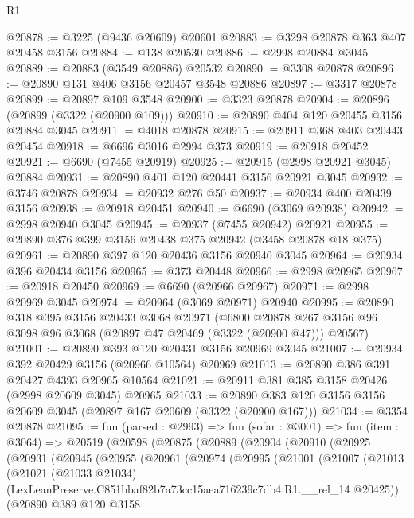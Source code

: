 \begin{lexlean}{R1}
\begin{coremodule}
@20878 := @3225 (@9436 @20609) @20601
@20883 := @3298 @20878 @363 @407 @20458 @3156
@20884 := @138 @20530
@20886 := @2998 @20884 @3045
@20889 := @20883 (@3549 @20886) @20532
@20890 := @3308 @20878
@20896 := @20890 @131 @406 @3156 @20457 @3548 @20886
@20897 := @3317 @20878
@20899 := @20897 @109 @3548
@20900 := @3323 @20878
@20904 := @20896 (@20899 (@3322 (@20900 @109)))
@20910 := @20890 @404 @120 @20455 @3156 @20884 @3045
@20911 := @4018 @20878
@20915 := @20911 @368 @403 @20443 @20454
@20918 := @6696 @3016 @2994 @373
@20919 := @20918 @20452
@20921 := @6690 (@7455 @20919)
@20925 := @20915 (@2998 @20921 @3045) @20884
@20931 := @20890 @401 @120 @20441 @3156 @20921 @3045
@20932 := @3746 @20878
@20934 := @20932 @276 @50
@20937 := @20934 @400 @20439 @3156
@20938 := @20918 @20451
@20940 := @6690 (@3069 @20938)
@20942 := @2998 @20940 @3045
@20945 := @20937 (@7455 @20942) @20921
@20955 := @20890 @376 @399 @3156 @20438 @375 @20942 (@3458 @20878 @18 @375)
@20961 := @20890 @397 @120 @20436 @3156 @20940 @3045
@20964 := @20934 @396 @20434 @3156
@20965 := @373 @20448
@20966 := @2998 @20965
@20967 := @20918 @20450
@20969 := @6690 (@20966 @20967)
@20971 := @2998 @20969 @3045
@20974 := @20964 (@3069 @20971) @20940
@20995 := @20890
    @318
    @395
    @3156
    @20433
    @3068
    @20971
    (@6800 @20878 @267 @3156 @96 @3098 @96 @3068 (@20897 @47 @20469 (@3322 (@20900 @47))) @20567)
@21001 := @20890 @393 @120 @20431 @3156 @20969 @3045
@21007 := @20934 @392 @20429 @3156 (@20966 @10564) @20969
@21013 := @20890 @386 @391 @20427 @4393 @20965 @10564
@21021 := @20911 @381 @385 @3158 @20426 (@2998 @20609 @3045) @20965
@21033 := @20890 @383 @120 @3156 @3156 @20609 @3045 (@20897 @167 @20609 (@3322 (@20900 @167)))
@21034 := @3354 @20878
@21095 := fun (parsed : @2993) =>
  fun (sofar : @3001) =>
  fun (item : @3064) =>
  @20519
    (@20598
      (@20875
        (@20889
          (@20904
            (@20910
              (@20925
                (@20931
                  (@20945
                    (@20955
                      (@20961
                        (@20974
                          (@20995
                            (@21001
                              (@21007
                                (@21013
                                  (@21021
                                    (@21033 @21034)
                                    (LexLeanPreserve.C851bbaf82b7a73cc15aea716239c7db4.R1.__rel_14
                                      @20425))
                                  (@20890
                                    @389
                                    @120
                                    @3158

\end{coremodule}
\end{lexlean}
